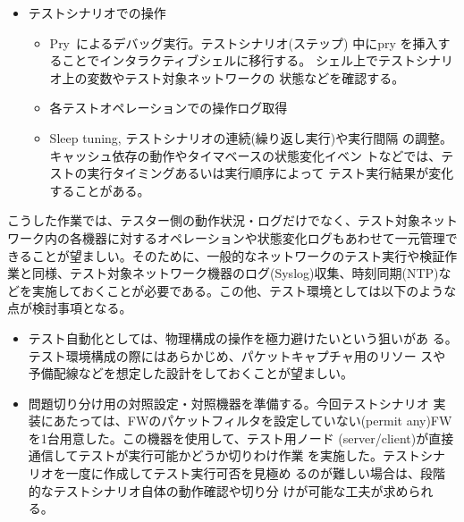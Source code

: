 \begin{itemize}
\begin{itemize}
              のOFSスイッチ接続ポート
              \footnote{のens5相当のイン
              タフェース}で、全テスト用ノードのトラフィックをキャプチャ
              できる。
        \item テスト用ノードの ARP テーブルの確認
        \item NetTester OFC(trema)でのデバッグ:
              \ref{sec:debugging-trema}節参照。
        \item OS上での不要な network namespace や veth インタフェース等
              の確認
       \end{itemize}
 \item テストシナリオでの操作
       \begin{itemize}
        \item Pry~\cite{pry}によるデバッグ実行。テストシナリオ(ステップ)
              中にpry を挿入することでインタラクティブシェルに移行する。
              シェル上でテストシナリオ上の変数やテスト対象ネットワークの
              状態などを確認する。
        \item 各テストオペレーションでの操作ログ取得
        \item Sleep tuning, テストシナリオの連続(繰り返し実行)や実行間隔
              の調整。キャッシュ依存の動作やタイマベースの状態変化イベン
              トなどでは、テストの実行タイミングあるいは実行順序によって
              テスト実行結果が変化することがある。
       \end{itemize}
\end{itemize}

こうした作業では、テスター側の動作状況・ログだけでなく、テスト対象ネット
ワーク内の各機器に対するオペレーションや状態変化ログもあわせて一元管理で
きることが望ましい。そのために、一般的なネットワークのテスト実行や検証作
業と同様、テスト対象ネットワーク機器のログ(Syslog)収集、時刻同期(NTP)な
どを実施しておくことが必要である。この他、テスト環境としては以下のような
点が検討事項となる。
\begin{itemize}
 \item テスト自動化としては、物理構成の操作を極力避けたいという狙いがあ
       る。テスト環境構成の際にはあらかじめ、パケットキャプチャ用のリソー
       スや予備配線などを想定した設計をしておくことが望ましい。
 \item 問題切り分け用の対照設定・対照機器を準備する。今回テストシナリオ
       実装にあたっては、FWのパケットフィルタを設定していない(permit
       any)FWを1台用意した。この機器を使用して、テスト用ノード
       (server/client)が直接通信してテストが実行可能かどうか切りわけ作業
       を実施した。テストシナリオを一度に作成してテスト実行可否を見極め
       るのが難しい場合は、段階的なテストシナリオ自体の動作確認や切り分
       けが可能な工夫が求められる。
\end{itemize}

